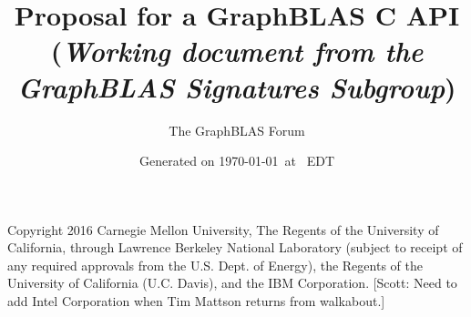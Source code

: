 \documentclass[11pt]{extarticle}
\begin{document}
\linenumbers

\title{Proposal for a GraphBLAS C API\\ (\emph{\large Working document from the \emph{GraphBLAS} Signatures Subgroup})}
\author{The GraphBLAS Forum}
\date{Generated on \today\ at \currenttime\ EDT}

\renewcommand{\vector}[1]{{\bf #1}}
\renewcommand{\matrix}[1]{{\bf #1}}
\newcommand{\zip}{{\mbox{zip}}}
\newcommand{\zap}{{\mbox{zap}}}
\newcommand{\ewiseadd}{{\mbox{\bf ewiseadd}}}
\newcommand{\ewisemult}{{\mbox{\bf ewisemult}}}
\newcommand{\mxm}{{\mbox{\bf mxm}}}
\newcommand{\vxm}{{\mbox{\bf vxm}}}
\newcommand{\mxv}{{\mbox{\bf mxv}}}
\newcommand{\gpit}[1]{{\sf #1}}
\newcommand{\ie}{\emph{i.e.}}
\newcommand{\eg}{\emph{e.g.}}
\newcommand{\nan}{{\sf NaN}}
\newcommand{\nil}{{\bf nil}}
\newcommand{\ifif}{{\bf if}}
\newcommand{\ifthen}{{\bf then}}
\newcommand{\ifelse}{{\bf else}}
\newcommand{\ifendif}{{\bf endif}}
\newcommand{\zero}{{\bf 0}}
\newcommand{\one}{{\bf 1}}


\newcommand{\aydin}[1]{{{\color{orange}[Aydin: #1]}}}
\newcommand{\scott}[1]{{{\color{violet}[Scott: #1]}}}
\newcommand{\tim}[1]{{{\color{teal}[Tim: #1]}}}
\newcommand{\jose}[1]{{{\color{red}[Jose: #1]}}}
\newcommand{\carl}[1]{{{\color{blue}[Carl: #1]}}}
\newcommand{\ajy}[1]{{{\color{brown}[Yzelman: #1]}}}


\renewcommand{\comment}[1]{{}}

\setlength{\parskip}{0.5\baselineskip}
\setlength{\parindent}{0ex}

\maketitle

\vfill

Copyright 2016 Carnegie Mellon University, The Regents of the University of California, through Lawrence Berkeley National Laboratory (subject to receipt of any required approvals from the U.S. Dept. of Energy), the Regents of the University of California (U.C. Davis), and the IBM Corporation. \scott{Need to add Intel Corporation when Tim Mattson returns from walkabout.}
\end{document}
